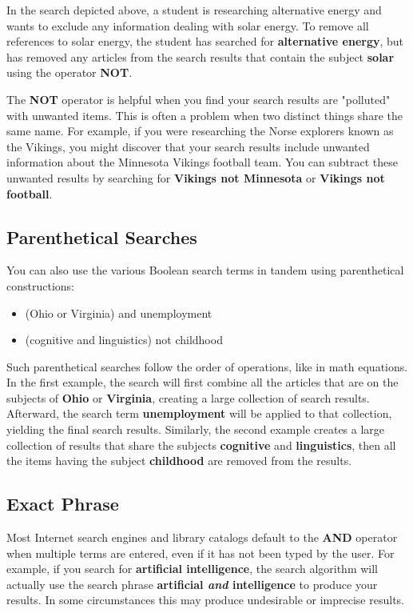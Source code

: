 {In the search depicted above, a student is researching alternative energy and 
wants to exclude any information dealing with solar energy. To remove all 
references to solar energy, the student has searched for \textbf{alternative 
energy}, but has removed any articles from the search results that contain the 
subject \textbf{solar} using the operator \textbf{NOT}. 

The \textbf{NOT} operator is helpful when you find your search results are 
"polluted" with unwanted items. This is often a problem when two distinct 
things share the same name. For example, if you were researching the Norse 
explorers known as the Vikings, you might discover that your search results 
include unwanted information about the Minnesota Vikings football team. You can 
subtract these unwanted results by searching for \textbf{Vikings not Minnesota} 
or \textbf{Vikings not football}.  

\subsection{Parenthetical Searches}

You can also use the various Boolean search terms in tandem using parenthetical 
constructions:

\begin{itemize}
\item (Ohio or Virginia) and unemployment
\item (cognitive and linguistics) not childhood
\end{itemize}
Such parenthetical searches follow the order of operations, like in math 
equations. In the first example, the search will first combine all the articles 
that are on the subjects of \textbf{Ohio} or \textbf{Virginia}, creating a 
large collection of search results. Afterward, the search term 
\textbf{unemployment} will be applied to that collection, yielding the final 
search results. Similarly, the second example creates a large collection of 
results that share the subjects \textbf{cognitive} and \textbf{linguistics}, 
then all the items having the subject \textbf{childhood} are removed from the 
results.

\subsection{Exact Phrase}

Most Internet search engines and library catalogs default to the \textbf{AND} 
operator when multiple terms are entered, even if it has not been typed by the 
user. For example, if you search for \textbf{artificial intelligence}, the 
search algorithm will actually use the search phrase \textbf{artificial 
\emph{and} intelligence} to produce your results. In some circumstances this 
may produce undesirable or imprecise results.

}
